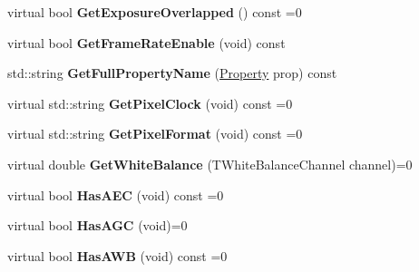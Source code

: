 \begin{DoxyCompactItemize}
\item 
\hypertarget{class_wizard_quick_setup_a2892d8bc7c950d46e98537fc545dfce2}{virtual bool {\bfseries Get\+Exposure\+Overlapped} () const =0}\label{class_wizard_quick_setup_a2892d8bc7c950d46e98537fc545dfce2}

\item 
\hypertarget{class_wizard_quick_setup_a9ae628cd9847f0dbd2603b32f505806b}{virtual bool {\bfseries Get\+Frame\+Rate\+Enable} (void) const }\label{class_wizard_quick_setup_a9ae628cd9847f0dbd2603b32f505806b}

\item 
\hypertarget{class_wizard_quick_setup_a2e9d1d30394cc023dc55cb0c204f4c33}{std\+::string {\bfseries Get\+Full\+Property\+Name} (\hyperlink{classmv_i_m_p_a_c_t_1_1acquire_1_1_property}{Property} prop) const }\label{class_wizard_quick_setup_a2e9d1d30394cc023dc55cb0c204f4c33}

\item 
\hypertarget{class_wizard_quick_setup_a8cbed5c007b893309b4faafcce2ed29e}{virtual std\+::string {\bfseries Get\+Pixel\+Clock} (void) const =0}\label{class_wizard_quick_setup_a8cbed5c007b893309b4faafcce2ed29e}

\item 
\hypertarget{class_wizard_quick_setup_a0b84b9dd6faf0a5de6efb2be4c9f0caf}{virtual std\+::string {\bfseries Get\+Pixel\+Format} (void) const =0}\label{class_wizard_quick_setup_a0b84b9dd6faf0a5de6efb2be4c9f0caf}

\item 
\hypertarget{class_wizard_quick_setup_a4d32bae2ecba233ce75f4681c8af105a}{virtual double {\bfseries Get\+White\+Balance} (T\+White\+Balance\+Channel channel)=0}\label{class_wizard_quick_setup_a4d32bae2ecba233ce75f4681c8af105a}

\item 
\hypertarget{class_wizard_quick_setup_a40b5c1727e7ba558c0d7b154377862cb}{virtual bool {\bfseries Has\+A\+E\+C} (void) const =0}\label{class_wizard_quick_setup_a40b5c1727e7ba558c0d7b154377862cb}

\item 
\hypertarget{class_wizard_quick_setup_af8c094ca623438b7118db4ee2cacf77d}{virtual bool {\bfseries Has\+A\+G\+C} (void)=0}\label{class_wizard_quick_setup_af8c094ca623438b7118db4ee2cacf77d}

\item 
\hypertarget{class_wizard_quick_setup_ac146eff77d3fcd24337c000dbe84f077}{virtual bool {\bfseries Has\+A\+W\+B} (void) const =0}\label{class_wizard_quick_setup_ac146eff77d3fcd24337c000dbe84f077}


\end{DoxyCompactItemize}

